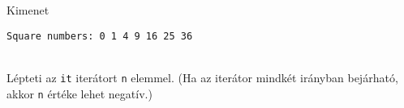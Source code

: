 \begin{frame}
    \begin{exampleblock}{}
        
    \end{exampleblock}
\end{frame}

\begin{frame}
    \begin{exampleblock}{}
        \small
        
    \end{exampleblock}
\end{frame}

\begin{frame}[fragile]
    \begin{block}{Kimenet}
        \vspace{-.4cm}
        \begin{verbatim}
Square numbers: 0 1 4 9 16 25 36
\end{verbatim}
        \vspace{-.3cm}
    \end{block}
    \vfill
    \begin{description}[m]
        \item[\hiv{\href{https://en.cppreference.com/w/cpp/iterator/advance}{\texttt{advance(it, n)}}}] \hfill \\ Lépteti az \texttt{it} iterátort \texttt{n} elemmel. (Ha az iterátor mindkét irányban bejárható, akkor \texttt{n} értéke lehet negatív.)
    \end{description}
\end{frame}

\begin{frame}
    \begin{exampleblock}{}
        \small
        
    \end{exampleblock}
\end{frame}

